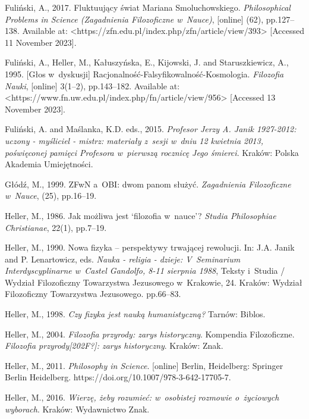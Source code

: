 Fuliński, A., 2017. Fluktuujący świat Mariana Smoluchowskiego. \textit{Philosophical Problems in Science (Zagadnienia Filozoficzne w~Nauce)}, [online] (62), pp.127–138. Available at: {\textless}https://zfn.edu.pl/index.php/zfn/article/view/393{\textgreater} [Accessed 11 November 2023].



Fuliński, A., Heller, M., Kałuszyńska, E., Kijowski, J. and Staruszkiewicz, A., 1995. [Głos w~dyskusji] Racjonalność-Falsyfikowalność-Kosmologia. \textit{Filozofia Nauki}, [online] 3(1–2), pp.143–182. Available at: {\textless}https://www.fn.uw.edu.pl/index.php/fn/article/view/956{\textgreater} [Accessed 13 November 2023].



Fuliński, A. and Maślanka, K.D. eds., 2015. \textit{Profesor Jerzy A. Janik 1927-2012: uczony - myśliciel - mistrz: materiały z~sesji w~dniu 12 kwietnia 2013, poświęconej pamięci Profesora w~pierwszą rocznicę Jego śmierci}. Kraków: Polska Akademia Umiejętności.



Głódź, M., 1999. ZFwN a~OBI: dwom panom służyć. \textit{Zagadnienia Filozoficzne w~Nauce}, (25), pp.16–19.



Heller, M., 1986. Jak możliwa jest ‘filozofia w~nauce'? \textit{Studia Philosophiae Christianae}, 22(1), pp.7–19.



Heller, M., 1990. Nowa fizyka -- perspektywy trwającej rewolucji. In: J.A. Janik and P. Lenartowicz, eds. \textit{Nauka - religia - dzieje: V~Seminarium Interdyscyplinarne w~Castel Gandolfo, 8-11 sierpnia 1988}, Teksty i~Studia / Wydział Filozoficzny Towarzystwa Jezusowego w~Krakowie, 24. Kraków: Wydział Filozoficzny Towarzystwa Jezusowego. pp.66–83.



Heller, M., 1998. \textit{Czy fizyka jest nauką humanistyczną?} Tarnów: Biblos.



Heller, M., 2004. \textit{Filozofia przyrody: zarys historyczny}. Kompendia Filozoficzne. \textit{Filozofia przyrody[202F?]: zarys historyczny}. Kraków: Znak.



Heller, M., 2011. \textit{Philosophy in Science}. [online] Berlin, Heidelberg: Springer Berlin Heidelberg. https://doi.org/10.1007/978-3-642-17705-7.



Heller, M., 2016. \textit{Wierzę, żeby rozumieć: w~osobistej rozmowie o~życiowych wyborach}. Kraków: Wydawnictwo Znak.



